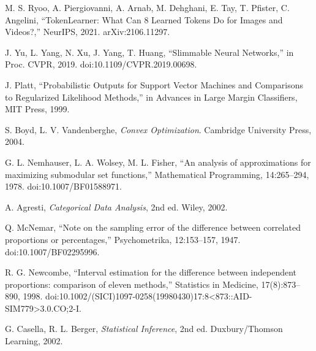 \begin{thebibliography}{99}
M. S. Ryoo, A. Piergiovanni, A. Arnab, M. Dehghani, E. Tay, T. Pfister, C. Angelini, ``TokenLearner: What Can 8 Learned Tokens Do for Images and Videos?,'' NeurIPS, 2021. arXiv:2106.11297.

J. Yu, L. Yang, N. Xu, J. Yang, T. Huang, ``Slimmable Neural Networks,'' in Proc. CVPR, 2019. doi:10.1109/CVPR.2019.00698.

J. Platt, ``Probabilistic Outputs for Support Vector Machines and Comparisons to Regularized Likelihood Methods,'' in Advances in Large Margin Classifiers, MIT Press, 1999.

S. Boyd, L. V. Vandenberghe, \emph{Convex Optimization}. Cambridge University Press, 2004.

G. L. Nemhauser, L. A. Wolsey, M. L. Fisher, ``An analysis of approximations for maximizing submodular set functions,'' Mathematical Programming, 14:265--294, 1978. doi:10.1007/BF01588971.

A. Agresti, \emph{Categorical Data Analysis}, 2nd ed. Wiley, 2002.

Q. McNemar, ``Note on the sampling error of the difference between correlated proportions or percentages,'' Psychometrika, 12:153--157, 1947. doi:10.1007/BF02295996.

R. G. Newcombe, ``Interval estimation for the difference between independent proportions: comparison of eleven methods,'' Statistics in Medicine, 17(8):873--890, 1998. doi:10.1002/(SICI)1097-0258(19980430)17:8<873::AID-SIM779>3.0.CO;2-I.

G. Casella, R. L. Berger, \emph{Statistical Inference}, 2nd ed. Duxbury/Thomson Learning, 2002.

\end{thebibliography}

